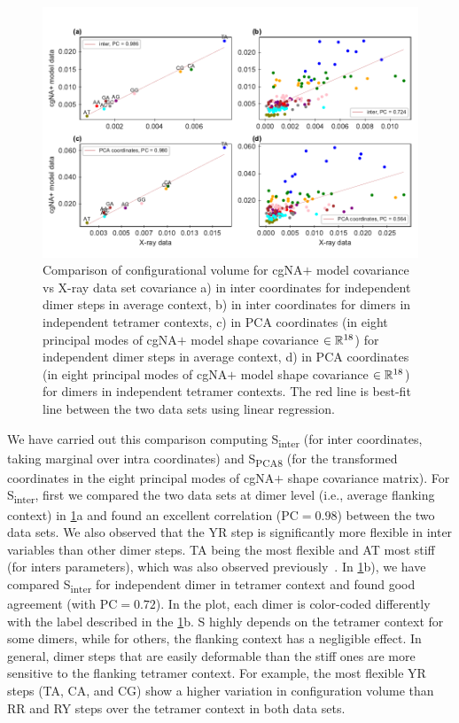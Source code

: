 \begin{figure}[htb!]
	\begin{center}
	\centering\includegraphics[trim = 0cm 0.4cm 0cm 0cm]{./Xray_images/vol_R2_DX3_3S_C1_cg.pdf}
	\centering\caption{Comparison of configurational volume
	for cgNA$+$ model covariance vs X-ray data set covariance a) in inter coordinates for independent dimer steps in average context, b) in inter coordinates for dimers in independent tetramer contexts, c) in PCA coordinates (in  eight principal modes of cgNA$+$ model shape covariance $\in {\mathbb R}^{18}$) for independent dimer steps in average context, d) in PCA coordinates (in  eight principal modes of cgNA$+$ model shape covariance $\in {\mathbb R}^{18}$) for dimers in independent tetramer contexts.
The red line is best-fit line between the two data sets using linear regression.
}

\label{fig:TX3stiff}
\end{center}
\end{figure}

We have carried out this comparison computing S\textsubscript{inter} (for inter coordinates, taking marginal over intra coordinates) and S\textsubscript{PCA8} (for the transformed coordinates in the eight principal modes of cgNA$+$ shape covariance matrix). 
For S\textsubscript{inter}, first we compared the two data sets at dimer level (i.e., average flanking context) in \cref{fig:TX3stiff}a and found an excellent correlation ($\text{PC} = 0.98$) between the two data sets.
We also observed that the YR step is significantly more flexible in inter variables than other dimer steps.
TA being the most flexible and AT most stiff (for inters parameters), which was also observed previously~\cite{lankavs2003dna, olson2006dna,el1997conformational}.
In \cref{fig:TX3stiff}b), we have compared  S\textsubscript{inter} for independent dimer in tetramer context and found good agreement (with $\text{PC} = 0.72$).
In the plot, each dimer is color-coded differently with the label described in the \cref{fig:TX3stiff}b.
S highly depends on the tetramer context for some dimers, while for others, the flanking context has a negligible effect.
In general, dimer steps that are easily deformable than the stiff ones are more sensitive to the flanking tetramer context.
For example, the most flexible YR steps (TA, CA, and CG) show a higher variation in configuration volume than RR and RY steps over the tetramer context in both data sets. 

